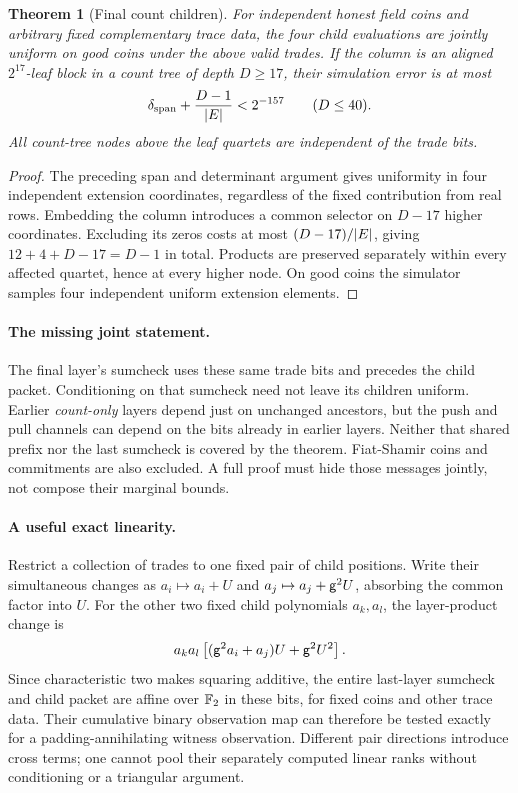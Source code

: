 \documentclass[11pt]{article}
\newtheorem{theorem}{Theorem}
\begin{document}
\begin{theorem}[Final count children]
For independent honest field coins and arbitrary fixed complementary trace data, the four child evaluations are jointly uniform on good coins under the above valid trades. If the column is an aligned $2^{17}$-leaf block in a count tree of depth $D\ge17$, their simulation error is at most
\[
 \delta_{\mathrm{span}}+\frac{D-1}{|E|}<2^{-157}
 \qquad(D\le40).
\]
All count-tree nodes above the leaf quartets are independent of the trade bits.
\end{theorem}
\begin{proof}
The preceding span and determinant argument gives uniformity in four independent extension coordinates, regardless of the fixed contribution from real rows. Embedding the column introduces a common selector on $D-17$ higher coordinates. Excluding its zeros costs at most $(D-17)/|E|$, giving $12+4+D-17=D-1$ in total. Products are preserved separately within every affected quartet, hence at every higher node. On good coins the simulator samples four independent uniform extension elements.
\end{proof}

\paragraph{The missing joint statement.} The final layer's sumcheck uses these same trade bits and precedes the child packet. Conditioning on that sumcheck need not leave its children uniform. Earlier \emph{count-only} layers depend just on unchanged ancestors, but the push and pull channels can depend on the bits already in earlier layers. Neither that shared prefix nor the last sumcheck is covered by the theorem. Fiat-Shamir coins and commitments are also excluded. A full proof must hide those messages jointly, not compose their marginal bounds.

\paragraph{A useful exact linearity.} Restrict a collection of trades to one fixed pair of child positions. Write their simultaneous changes as $a_i\mapsto a_i+U$ and $a_j\mapsto a_j+\mathsf{g}^2 U$, absorbing the common factor into $U$. For the other two fixed child polynomials $a_k,a_l$, the layer-product change is
\[
 a_k a_l\left[(\mathsf{g}^2 a_i+a_j)U+\mathsf{g}^2 U^2\right].
\]
Since characteristic two makes squaring additive, the entire last-layer sumcheck and child packet are affine over $\mathbb{F}_2$ in these bits, for fixed coins and other trace data. Their cumulative binary observation map can therefore be tested exactly for a padding-annihilating witness observation. Different pair directions introduce cross terms; one cannot pool their separately computed linear ranks without conditioning or a triangular argument.
\end{document}
